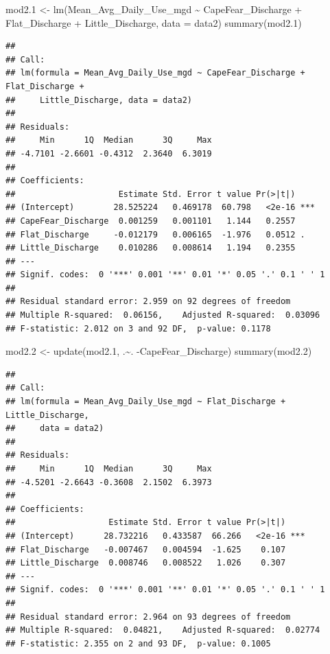 \documentclass[
  12pt,
]{article}
\newenvironment{Shaded}{\begin{snugshade}}{\end{snugshade}}
\newcommand{\AttributeTok}[1]{\textcolor[rgb]{0.77,0.63,0.00}{#1}}
\newcommand{\FloatTok}[1]{\textcolor[rgb]{0.00,0.00,0.81}{#1}}
\newcommand{\FunctionTok}[1]{\textcolor[rgb]{0.00,0.00,0.00}{#1}}
\newcommand{\NormalTok}[1]{#1}
\newcommand{\OtherTok}[1]{\textcolor[rgb]{0.56,0.35,0.01}{#1}}
\newcommand{\SpecialCharTok}[1]{\textcolor[rgb]{0.00,0.00,0.00}{#1}}
\begin{document}
\begin{Shaded}
\begin{Highlighting}[]
\NormalTok{mod2}\FloatTok{.1} \OtherTok{\textless{}{-}} \FunctionTok{lm}\NormalTok{(Mean\_Avg\_Daily\_Use\_mgd }\SpecialCharTok{\textasciitilde{}}\NormalTok{ CapeFear\_Discharge }\SpecialCharTok{+}\NormalTok{ Flat\_Discharge }\SpecialCharTok{+}\NormalTok{ Little\_Discharge, }\AttributeTok{data =}\NormalTok{ data2)}
\FunctionTok{summary}\NormalTok{(mod2}\FloatTok{.1}\NormalTok{)}
\end{Highlighting}
\end{Shaded}

\begin{verbatim}
## 
## Call:
## lm(formula = Mean_Avg_Daily_Use_mgd ~ CapeFear_Discharge + Flat_Discharge + 
##     Little_Discharge, data = data2)
## 
## Residuals:
##     Min      1Q  Median      3Q     Max 
## -4.7101 -2.6601 -0.4312  2.3640  6.3019 
## 
## Coefficients:
##                     Estimate Std. Error t value Pr(>|t|)    
## (Intercept)        28.525224   0.469178  60.798   <2e-16 ***
## CapeFear_Discharge  0.001259   0.001101   1.144   0.2557    
## Flat_Discharge     -0.012179   0.006165  -1.976   0.0512 .  
## Little_Discharge    0.010286   0.008614   1.194   0.2355    
## ---
## Signif. codes:  0 '***' 0.001 '**' 0.01 '*' 0.05 '.' 0.1 ' ' 1
## 
## Residual standard error: 2.959 on 92 degrees of freedom
## Multiple R-squared:  0.06156,    Adjusted R-squared:  0.03096 
## F-statistic: 2.012 on 3 and 92 DF,  p-value: 0.1178
\end{verbatim}

\begin{Shaded}
\begin{Highlighting}[]
\NormalTok{mod2}\FloatTok{.2} \OtherTok{\textless{}{-}} \FunctionTok{update}\NormalTok{(mod2}\FloatTok{.1}\NormalTok{, .}\SpecialCharTok{\textasciitilde{}}\NormalTok{. }\SpecialCharTok{{-}}\NormalTok{CapeFear\_Discharge)}
\FunctionTok{summary}\NormalTok{(mod2}\FloatTok{.2}\NormalTok{)}
\end{Highlighting}
\end{Shaded}

\begin{verbatim}
## 
## Call:
## lm(formula = Mean_Avg_Daily_Use_mgd ~ Flat_Discharge + Little_Discharge, 
##     data = data2)
## 
## Residuals:
##     Min      1Q  Median      3Q     Max 
## -4.5201 -2.6643 -0.3608  2.1502  6.3973 
## 
## Coefficients:
##                   Estimate Std. Error t value Pr(>|t|)    
## (Intercept)      28.732216   0.433587  66.266   <2e-16 ***
## Flat_Discharge   -0.007467   0.004594  -1.625    0.107    
## Little_Discharge  0.008746   0.008522   1.026    0.307    
## ---
## Signif. codes:  0 '***' 0.001 '**' 0.01 '*' 0.05 '.' 0.1 ' ' 1
## 
## Residual standard error: 2.964 on 93 degrees of freedom
## Multiple R-squared:  0.04821,    Adjusted R-squared:  0.02774 
## F-statistic: 2.355 on 2 and 93 DF,  p-value: 0.1005
\end{verbatim}
\end{document}
